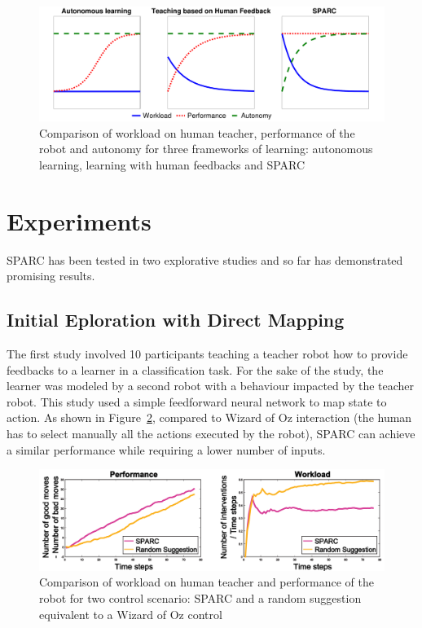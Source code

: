 \documentclass[conference]{IEEEtran}
\begin{document}
\begin{figure}
    \centering
    \includegraphics[width=0.9\linewidth]{motivation.pdf}
    \caption{Comparison of workload on human teacher, performance of the robot
    and autonomy for three frameworks of learning: autonomous learning, learning
    with human feedbacks and SPARC}
    \label{fig:comparison}
\end{figure}

\section{Experiments}

SPARC has been tested in two explorative studies and so far has demonstrated
promising results.

\subsection{Initial Eploration with Direct Mapping}

The first study \cite{senft2015sparc} involved 10 participants teaching a teacher robot how to provide
feedbacks to a learner in a classification task. For the sake of the study, the
learner was modeled by a second robot with a behaviour impacted by the teacher
robot. This study used a simple feedforward neural network to map state to
action. As shown in Figure~\ref{fig:ICSR}, compared to Wizard of Oz interaction
(the human has to select manually all the actions executed by the robot), SPARC
can achieve a similar performance while requiring a lower number of inputs.

\begin{figure}
    \centering
    \includegraphics[width=0.9\linewidth]{ICSR.pdf}
    \caption{Comparison of workload on human teacher and performance of the robot
    for two control scenario: SPARC and a random suggestion equivalent to a
    Wizard of Oz control}
    \label{fig:ICSR}
\end{figure}
\end{document}
